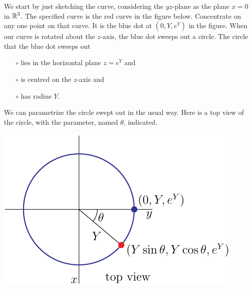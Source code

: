 \begin{eg}
We start by just sketching the curve, considering the $yz$-plane as 
the plane $x=0$ in $\mathbb{R}^3$. The specified curve is the red curve 
in the figure below.
Concentrate on any one point on that curve. It is the blue dot at $(0,Y,e^Y)$
in the figure. When our curve is rotated about the $z$-axis, the blue dot
sweeps out a circle. The circle that the blue dot sweeps out
\begin{itemize}\itemsep1pt \parskip0pt  %
\item[$\circ$]
lies in the horizontal plane $z=e^Y$ and
\item[$\circ$]
is centred on the $z$-axis and
\item[$\circ$]
has radius $Y$.
\end{itemize}
We can parametrize the circle swept out in the usual way. Here
is a top view of the circle, with the parameter, named $\theta$, indicated. 
\begin{nfig}
\begin{center}
    \includegraphics{revTop.pdf}

\end{center}
\end{nfig}
\end{eg}
